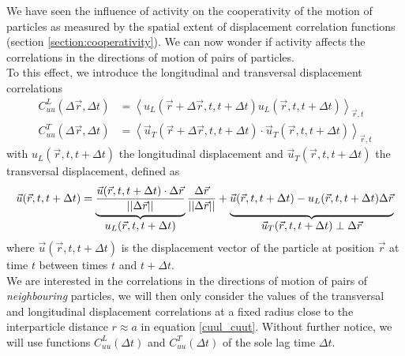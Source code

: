 \documentclass[class=report, float=false, crop=false]{standalone}
\begin{document}

We have seen the influence of activity on the cooperativity of the motion of particles as measured by the spatial extent of displacement correlation functions (section \ref{section:cooperativity}). We can now wonder if activity affects the correlations in the directions of motion of pairs of particles.\\

To this effect, we introduce the longitudinal and transversal displacement correlations \cite{weeks2007short, vasisht2018rate}
\begin{equation}
\begin{aligned}
C_{uu}^L(\Delta\vec{r}, \Delta t) &= \left<u_L(\vec{r} + \Delta \vec{r}, t, t + \Delta t)u_L(\vec{r}, t, t + \Delta t)\right>_{\vec{r}, t}\\
C_{uu}^T(\Delta\vec{r}, \Delta t) &= \left<\vec{u}_T(\vec{r} + \Delta \vec{r}, t, t + \Delta t)\cdot\vec{u}_T(\vec{r}, t, t + \Delta t)\right>_{\vec{r}, t}
\end{aligned}
\label{cuul_cuut}
\end{equation}
with $u_L(\vec{r}, t, t + \Delta t)$ the longitudinal displacement and $\vec{u}_T(\vec{r}, t, t + \Delta t)$ the transversal displacement, defined as
\begin{equation}
\vec{u}(\vec{r}, t, t + \Delta t) = \underbrace{\frac{\vec{u}(\vec{r}, t, t + \Delta t)\cdot\Delta\vec{r}}{||\Delta\vec{r}||}}_{\displaystyle u_L(\vec{r}, t, t + \Delta t)}\frac{\Delta\vec{r}}{||\Delta\vec{r}||} + \underbrace{\vphantom{\frac{\vec{u}(\vec{r}, t, t + \Delta t)\cdot\Delta\vec{r}}{||\Delta\vec{r}||}}\vec{u}(\vec{r}, t, t + \Delta t) - u_L(\vec{r}, t, t + \Delta t)\Delta\vec{r}}_{\displaystyle\vec{u}_T(\vec{r}, t, t + \Delta t)\perp\Delta\vec{r}}
\end{equation}
where $\vec{u}(\vec{r}, t, t + \Delta t)$ is the displacement vector of the particle at position $\vec{r}$ at time $t$ between times $t$ and $t + \Delta t$.\\

We are interested in the correlations in the directions of motion of pairs of \textit{neighbouring} particles, we will then only consider the values of the transversal and longitudinal displacement correlations at a fixed radius close to the interparticle distance $r \approx a$ in equation \ref{cuul_cuut}. Without further notice, we will use functions $C_{uu}^L(\Delta t)$ and $C_{uu}^T(\Delta t)$ of the sole lag time $\Delta t$.

\end{document}
